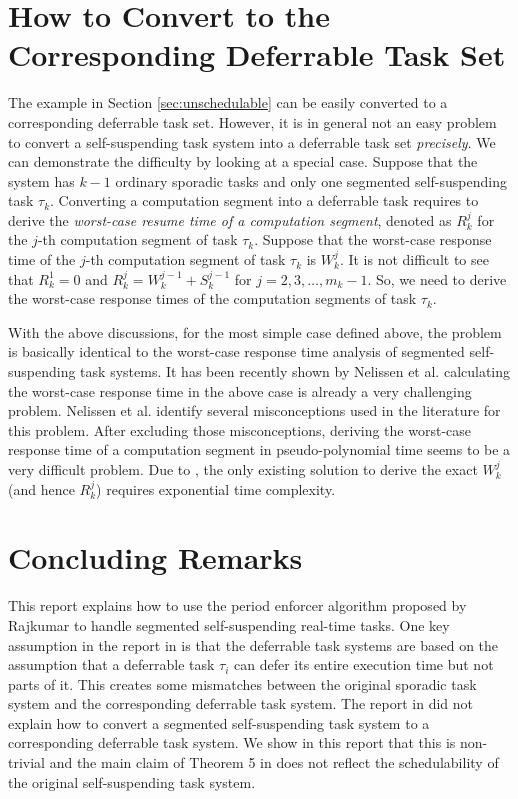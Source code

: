\section{How to Convert to the Corresponding Deferrable Task Set}
\label{sec:convert}

The example in Section \ref{sec:unschedulable} can be easily converted to a corresponding deferrable task set. However, it is in general not an easy problem to convert a self-suspending task system into a deferrable task set \emph{precisely}. We can demonstrate the difficulty by looking at a special case. Suppose that the system has $k-1$ ordinary sporadic tasks and only one segmented self-suspending task $\tau_k$. Converting a computation segment into a deferrable task requires to derive the \emph{worst-case resume time of a computation segment}, denoted as $R_k^j$ for the $j$-th computation segment of task $\tau_k$. Suppose that the worst-case response time of the $j$-th computation segment of task $\tau_k$ is $W_k^j$. It is not difficult to see that $R_k^1=0$ and $R_k^j = W_k^{j-1}+S_k^{j-1}$ for $j=2,3,\ldots,m_k-1$. So, we need to derive the worst-case response times of the computation segments of task $\tau_k$. 

With the above discussions, for the most simple case defined above, the problem is basically identical to the worst-case response time analysis of segmented self-suspending task systems. It has been recently shown by Nelissen et al. \cite{ecrts15nelissen}  calculating the worst-case response time in the above case is already a very challenging problem. Nelissen et al. \cite{ecrts15nelissen} identify several misconceptions used in the literature for this problem. After excluding those misconceptions, deriving the worst-case response time of a computation segment in pseudo-polynomial time seems to be a very difficult problem. Due to \cite{ecrts15nelissen}, the only existing solution to derive the exact $W_k^{j}$ (and hence $R_k^j$) requires exponential time complexity. 

\section{Concluding Remarks}

This report explains how to use the period enforcer algorithm proposed by Rajkumar \cite{Raj:suspension1991} to handle segmented self-suspending real-time tasks. One key assumption in the report in \cite{Raj:suspension1991} is that the deferrable task systems are based on the assumption that a deferrable task $\tau_i$ can defer its entire execution time but not parts of it. This creates some mismatches between the original sporadic task system and the corresponding deferrable task system.  The report in  \cite{Raj:suspension1991} did not explain how to convert a segmented self-suspending task system to a corresponding deferrable task system. We show in this report that this is non-trivial and the main claim of Theorem 5 in \cite{Raj:suspension1991} does not reflect the schedulability of the original self-suspending task system. 


